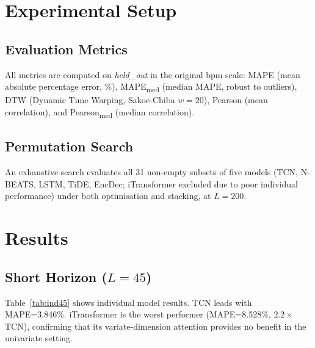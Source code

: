 \documentclass[conference]{IEEEtran}
\begin{document}
\section{Experimental Setup}
\label{sec:setup}

\subsection{Evaluation Metrics}
All metrics are computed on \textit{held\_out} in the original bpm scale:
MAPE (mean absolute percentage error, \%), MAPE\textsubscript{med} (median
MAPE, robust to outliers), DTW (Dynamic Time Warping, Sakoe-Chiba $w=20$),
Pearson (mean correlation), and Pearson\textsubscript{med} (median
correlation).

\subsection{Permutation Search}
An exhaustive search evaluates all 31 non-empty subsets of five models (TCN,
N-BEATS, LSTM, TiDE, EncDec; iTransformer excluded due to poor individual
performance) under both optimisation and stacking, at $L=200$.

\section{Results}
\label{sec:results}

\subsection{Short Horizon ($L=45$)}

Table~\ref{tab:ind45} shows individual model results. TCN leads with
MAPE=3.846\%. iTransformer is the worst performer (MAPE=8.528\%, $2.2\times$
TCN), confirming that its variate-dimension attention provides no benefit in
the univariate setting.
\end{document}

